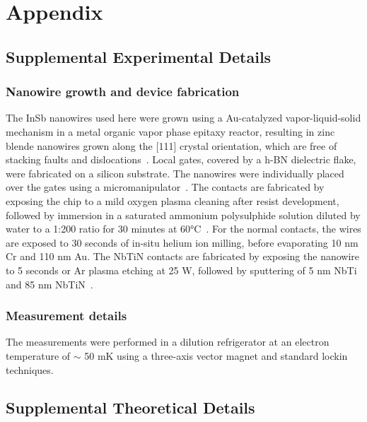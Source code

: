 \section{Appendix}\label{sec:appendix}

\subsection{Supplemental Experimental Details}
\subsubsection{Nanowire growth and device fabrication}
The \mbox{InSb} nanowires used here were grown using a Au-catalyzed vapor-liquid-solid mechanism in a metal organic vapor phase epitaxy reactor, resulting in zinc blende nanowires grown \mbox{along} the [111] crystal orientation, which are free of stacking \mbox{faults} and dislocations~\cite{Car2014}.
Local gates, covered by a h-BN dielectric flake, were fabricated on a silicon substrate.
The nanowires were individually placed over the gates using a micromanipulator~\cite{Floehr2011}.
The contacts are fabricated by exposing the chip to a mild oxygen plasma cleaning after resist development, followed by immersion in a saturated ammonium polysulphide solution diluted by water to a 1:200 ratio for 30 minutes at \ang{60}C~\cite{Suyatin2007}.
For the normal contacts, the wires are exposed to 30 seconds of in-situ helium ion milling, before evaporating 10 nm Cr and 110 nm Au.
The NbTiN contacts are fabricated by exposing the nanowire to 5 seconds or Ar plasma etching at 25 W, followed by sputtering of 5 nm NbTi and 85 nm NbTiN~\cite{Guel2017,Zhang2017}.

\subsubsection{Measurement details}
The measurements were performed in a dilution refrigerator at an electron temperature of $\sim$ 50 mK  using a three-axis vector magnet and standard lockin techniques.

\subsection{Supplemental Theoretical Details}\label{sec:spin_orbit_supplemental_theory}
